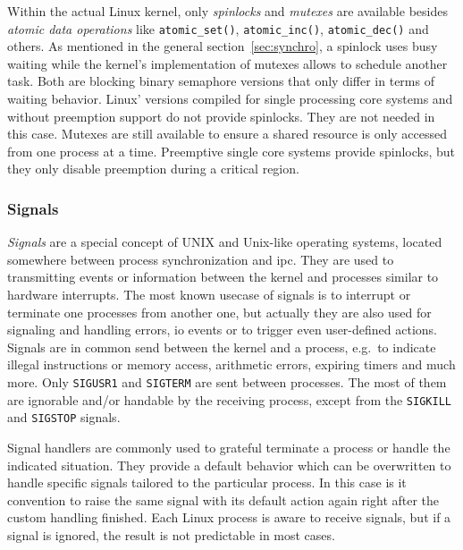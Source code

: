 Within the actual Linux kernel, only \textit{spinlocks} and \textit{mutexes} are available besides \textit{atomic data operations} like \texttt{atomic\_set()}, \texttt{atomic\_inc()}, \texttt{atomic\_dec()} and others\cite{achilles2006betriebssysteme}.
As mentioned in the general section~\ref{sec:synchro}, a spinlock uses busy waiting while the kernel's implementation of mutexes allows to schedule another task.
Both are blocking binary semaphore versions that only differ in terms of waiting behavior\cite{linux-locking}.
Linux' versions compiled for single processing core systems and without preemption support do not provide spinlocks.
They are not needed in this case.
Mutexes are still available to ensure a shared resource is only accessed from one process at a time.
Preemptive single core systems provide spinlocks, but they only disable preemption during a critical region\cite{linux-locking}.

\subsubsection*{Signals}
\textit{Signals} are a special concept of UNIX and Unix-like operating systems, located somewhere between process synchronization and \ac{ipc}.
They are used to transmitting events or information between the kernel and processes similar to hardware interrupts\cite{glatz2015betriebssysteme}.
The most known usecase of signals is to interrupt or terminate one processes from another one, but actually they are also used for signaling and handling errors, \ac{io} events or to trigger even user-defined actions\cite{achilles2006betriebssysteme}.
Signals are in common send between the kernel and a process, e.g.\ to indicate illegal instructions or memory access, arithmetic errors, expiring timers and much more.
Only \texttt{SIGUSR1} and \texttt{SIGTERM} are sent between processes.
The most of them are ignorable and/or handable by the receiving process, except from the \texttt{SIGKILL} and \texttt{SIGSTOP} signals\cite{achilles2006betriebssysteme}.

Signal handlers are commonly used to grateful terminate a process or handle the indicated situation.
They provide a default behavior which can be overwritten to handle specific signals tailored to the particular process.
In this case is it convention to raise the same signal with its default action again right after the custom handling finished\cite{achilles2006betriebssysteme}.
Each Linux process is aware to receive signals, but if a signal is ignored, the result is not predictable in most cases. 

